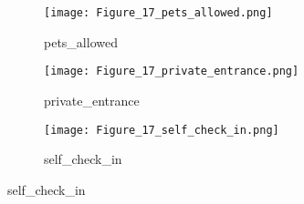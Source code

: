\begin{figure}[ht!]
\begin{center}
\begin{subfigure}[b]{0.3\textwidth}
    \end{subfigure}
    \hfill
    \begin{subfigure}[b]{0.3\textwidth}
        \centering
        \caption{pets\_allowed}
        \texttt{[image: Figure\_17\_pets\_allowed.png]}
    \end{subfigure}
    \hfill
    \begin{subfigure}[b]{0.3\textwidth}
        \centering
        \caption{private\_entrance}
        \texttt{[image: Figure\_17\_private\_entrance.png]}
    \end{subfigure}
    \hfill
    \begin{subfigure}[b]{0.3\textwidth}
        \centering
        \caption{self\_check\_in}
        \texttt{[image: Figure\_17\_self\_check\_in.png]}
    \end{subfigure}

    \end{center}
\end{figure}


